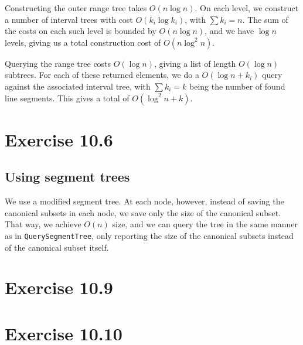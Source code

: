 \documentclass[11pt,a4paper]{article}
\begin{document}
Constructing the outer range tree takes $O(n \log n)$. On each level, we construct a
number of interval trees with cost $O(k_i \log k_i)$, with $\sum k_i = n$. The sum of
the costs on each such level is bounded by $O(n \log n)$, and we have $\log n$ levels,
giving us a total construction cost of $O(n \log^2 n)$.

Querying the range tree costs $O(\log n)$, giving a list of length $O(\log n)$
subtrees. For each of these returned elements, we do a $O(\log n + k_i)$ query
against the associated interval tree, with $\sum k_i = k$ being the number of
found line segments. This gives a total of $O(\log^2 n + k)$.

\section{Exercise 10.6}

\subsection{Using segment trees}

We use a modified segment tree. At each node, however, instead of
saving the canonical subsets in each node, we save only the size of
the canonical subset. That way, we achieve $O(n)$ size, and we can
query the tree in the same manner as in \verb+QuerySegmentTree+, only
reporting the size of the canonical subsets instead of the canonical
subset itself.

\section{Exercise 10.9}

\section{Exercise 10.10}
\end{document}
